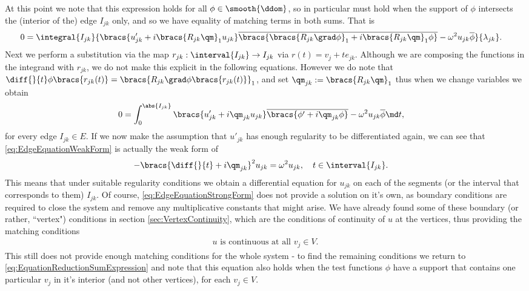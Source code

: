 At this point we note that this expression holds for all $\phi\in\smooth{\ddom}$, so in particular must hold when the support of $\phi$ intersects the (interior of the) edge $I_{jk}$ only, and so we have equality of matching terms in both sums.
That is
\begin{align*}
	0 &= \integral{I_{jk}}{\bracs{u_{jk}' + i\bracs{R_{jk}\qm}_1 u_{jk}}\overline{\bracs{\bracs{R_{jk}\grad\phi}_1 + i\bracs{R_{jk}\qm}_1 \phi}} - \omega^2 u_{jk}\overline{\phi}}{\lambda_{jk}}.
\end{align*}
Next we perform a substitution via the map $r_{jk}:\interval{I_{jk}}\rightarrow I_{jk}$ via $r(t) = v_{j}+t e_{jk}$.
Although we are composing the functions in the integrand with $r_{jk}$, we do not make this explicit in the following equations.
However we do note that $\diff{}{t}\phi\bracs{r_{jk}(t)} = \bracs{R_{jk}\grad\phi\bracs{r_{jk}(t)}}_1$, and set $\qm_{jk} := \bracs{R_{jk}\qm}_1$ thus when we change variables we obtain
\begin{align} \label{eq:EdgeEquationWeakForm}
	0 &= \int_0^{\abs{I_{jk}}} \bracs{ u'_{jk} + i\qm_{jk}u_{jk} } \overline{\bracs{ \phi' + i\qm_{jk}\phi }} - \omega^2 u_{jk}\overline{\phi} \md t,
\end{align}
for every edge $I_{jk}\in E$. 
If we now make the assumption that $u'_{jk}$ has enough regularity to be differentiated again, we can see that \eqref{eq:EdgeEquationWeakForm} is actually the weak form of
\begin{align} \label{eq:EdgeEquationStrongForm}
	-\bracs{\diff{}{t} + i\qm_{jk}}^2 u_{jk} &= \omega^2 u_{jk}, \quad t\in\interval{I_{jk}}.
\end{align}
This means that under suitable regularity conditions we obtain a differential equation for $u_{jk}$ on each of the segments (or the interval that corresponds to them) $I_{jk}$.
Of course, \eqref{eq:EdgeEquationStrongForm} does not provide a solution on it's own, as boundary conditions are required to close the system and remove any multiplicative constants that might arise.
We have already found some of these boundary (or rather, ``vertex") conditions in section \ref{sec:VertexContinuity}, which are the conditions of continuity of $u$ at the vertices, thus providing the matching conditions
\begin{align} \label{eq:EdgeEquationsMatchingConditons}
	u \text{ is continuous at all } v_j\in V.
\end{align}
This still does not provide enough matching conditions for the whole system - to find the remaining conditions we return to \eqref{eq:EquationReductionSumExpression} and note that this equation also holds when the test functions $\phi$ have a support that contains one particular $v_j$ in it's interior (and not other vertices), for each $v_j\in V$.
